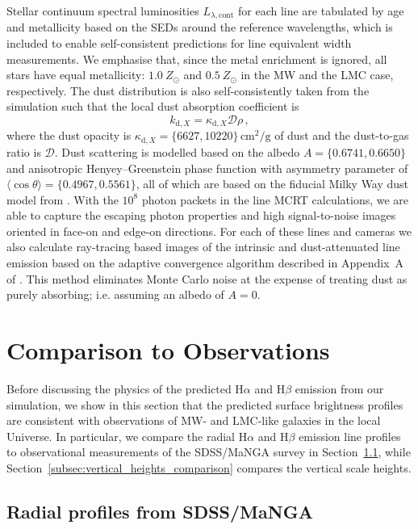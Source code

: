 \documentclass[fleqn,usenatbib]{mnras}
\begin{document}
Stellar continuum spectral luminosities $L_{\lambda,\text{cont}}$ for each line are tabulated by age and metallicity based on the SEDs around the reference wavelengths, which is included to enable self-consistent predictions for line equivalent width measurements. We emphasise that, since the metal enrichment is ignored, all stars have equal metallicity: $1.0~Z_{\odot}$ and $0.5~Z_{\odot}$ in the MW and the LMC case, respectively.
The dust distribution is also self-consistently taken from the simulation such that the local dust absorption coefficient is
\begin{equation}
  k_{\text{d},X} = \kappa_{\text{d},X} \mathcal{D} \rho \, ,
\end{equation}
where the dust opacity is $\kappa_{\text{d},X} = \{6627, 10220\}\,\text{cm}^2/\text{g}$ of dust and the dust-to-gas ratio is $\mathcal{D}$. Dust scattering is modelled based on the albedo $A = \{0.6741, 0.6650\}$ and anisotropic Henyey--Greenstein phase function with asymmetry parameter of $\langle \cos\theta \rangle = \{0.4967, 0.5561\}$, all of which are based on the fiducial Milky Way dust model from \citet{weingartner01}. With the $10^8$ photon packets in the line MCRT calculations, we are able to capture the escaping photon properties and high signal-to-noise images oriented in face-on and edge-on directions. For each of these lines and cameras we also calculate ray-tracing based images of the intrinsic and dust-attenuated line emission based on the adaptive convergence algorithm described in Appendix~A of \citet{yang20}. This method eliminates Monte Carlo noise at the expense of treating dust as purely absorbing; i.e. assuming an albedo of $A = 0$.

\section{Comparison to Observations}
\label{sec:observations}

Before discussing the physics of the predicted H$\alpha$ and H$\beta$ emission from our simulation, we show in this section that the predicted surface brightness profiles are consistent with observations of MW- and LMC-like galaxies in the local Universe. In particular, we compare the radial H$\alpha$ and H$\beta$ emission line profiles to observational measurements of the SDSS/MaNGA survey in Section~\ref{subsec:radial_profile_comparison}, while Section~\ref{subsec:vertical_heights_comparison} compares the vertical scale heights.


\subsection{Radial profiles from SDSS/MaNGA}
\label{subsec:radial_profile_comparison}
\end{document}
